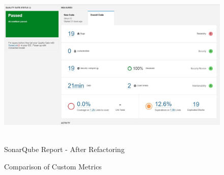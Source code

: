 \documentclass[12pt,letterpaper]{report}
\begin{document}
{\begin{figure}[h!]
    \centering
    \includegraphics[width=0.9\linewidth]{Images/sonar_report_after.jpeg}\
    \caption{SonarQube Report - After Refactoring}
    \label{fig:enter-label}
\end{figure}


\begin{figure}[!tbp]
  \centering
  \hfill
  \caption{Comparison of Custom Metrics}
\end{figure}


}
\end{document}

